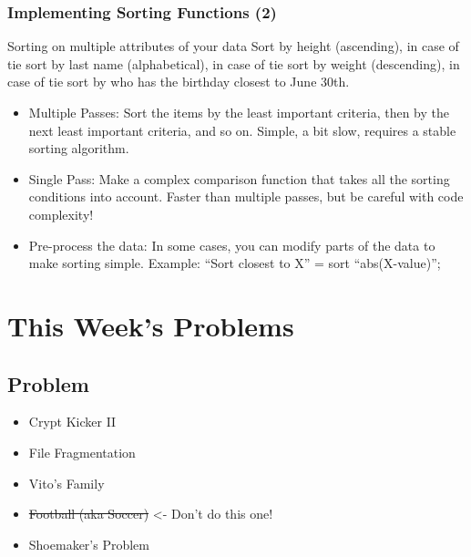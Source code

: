\documentclass{beamer}
\begin{document}
\begin{frame}
  \frametitle{Implementing Sorting Functions (2)}
  \begin{block}{Sorting on multiple attributes of your data}
    Sort by height (ascending), in case of tie sort by last name
    (alphabetical), in case of tie sort by weight (descending), in
    case of tie sort by who has the birthday closest to June 30th.
  \end{block}
  \medskip
  \begin{itemize}
  \item<1> Multiple Passes: Sort the items by the least important
    criteria, then by the next least important criteria, and so
    on. Simple, a bit slow, requires a stable sorting algorithm.
  \item<2> Single Pass: Make a complex comparison function that takes
    all the sorting conditions into account. Faster than multiple
    passes, but be careful with code complexity!
  \item<3> Pre-process the data: In some cases, you can modify parts
    of the data to make sorting simple. Example: ``Sort closest to X''
    = sort ``abs(X-value)'';
  \end{itemize}
\end{frame}

\section{This Week's Problems}

\subsection{Problem}
\begin{frame}
  \begin{itemize}
  \item Crypt Kicker II
  \item File Fragmentation
  \item Vito's Family
  \item \sout{Football (aka Soccer)} <- \alert{Don't do this one!}
  \item Shoemaker's Problem
  \end{itemize}
\end{frame}
\end{document}
